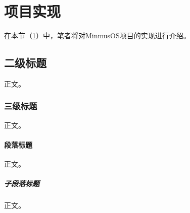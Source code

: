 \section{项目实现}\label{sec:ProjectImplementation}

在本节（\cref{sec:ProjectImplementation}）中，笔者将对MinmusOS项目的实现进行介绍。

\subsection{二级标题}

正文。

\subsubsection{三级标题}

正文。

\paragraph{段落标题}

正文。

\subparagraph{子段落标题}

正文。